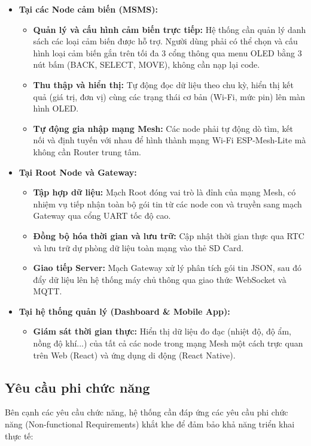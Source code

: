 \documentclass{article} %
\begin{document}
\begin{itemize}
    \item \textbf{Tại các Node cảm biến (MSMS):}
    \begin{itemize}
        \item \textbf{Quản lý và cấu hình cảm biến trực tiếp:} Hệ thống cần quản lý danh sách các loại cảm biến được hỗ trợ. Người dùng phải có thể chọn và cấu hình loại cảm biến gắn trên tối đa 3 cổng thông qua menu OLED bằng 3 nút bấm (BACK, SELECT, MOVE), không cần nạp lại code.
        \item \textbf{Thu thập và hiển thị:} Tự động đọc dữ liệu theo chu kỳ, hiển thị kết quả (giá trị, đơn vị) cùng các trạng thái cơ bản (Wi-Fi, mức pin) lên màn hình OLED.
        \item \textbf{Tự động gia nhập mạng Mesh:} Các node phải tự động dò tìm, kết nối và định tuyến với nhau để hình thành mạng Wi-Fi ESP-Mesh-Lite mà không cần Router trung tâm.
    \end{itemize}
    
    \item \textbf{Tại Root Node và Gateway:}
    \begin{itemize}
        \item \textbf{Tập hợp dữ liệu:} Mạch Root đóng vai trò là đỉnh của mạng Mesh, có nhiệm vụ tiếp nhận toàn bộ gói tin từ các node con và truyền sang mạch Gateway qua cổng UART tốc độ cao.
        \item \textbf{Đồng bộ hóa thời gian và lưu trữ:} Cập nhật thời gian thực qua RTC và lưu trữ dự phòng dữ liệu toàn mạng vào thẻ SD Card.
        \item \textbf{Giao tiếp Server:} Mạch Gateway xử lý phân tích gói tin JSON, sau đó đẩy dữ liệu lên hệ thống máy chủ thông qua giao thức WebSocket và MQTT.
    \end{itemize}
    
    \item \textbf{Tại hệ thống quản lý (Dashboard \& Mobile App):}
    \begin{itemize}
        \item \textbf{Giám sát thời gian thực:} Hiển thị dữ liệu đo đạc (nhiệt độ, độ ẩm, nồng độ khí...) của tất cả các node trong mạng Mesh một cách trực quan trên Web (React) và ứng dụng di động (React Native).
    \end{itemize}
\end{itemize}

\subsection{Yêu cầu phi chức năng}
\label{yeucauphichucnang}
Bên cạnh các yêu cầu chức năng, hệ thống cần đáp ứng các yêu cầu phi chức năng (Non-functional Requirements) khắt khe để đảm bảo khả năng triển khai thực tế:
\end{document}
